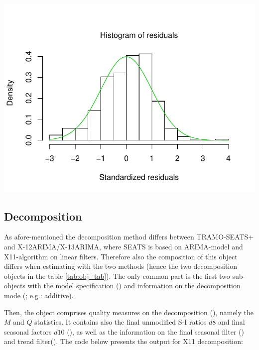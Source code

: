 \documentclass[article]{jss}
\begin{document}
\begin{CodeChunk}


\begin{center}\includegraphics{img/img-unnamed-chunk-6-1} \end{center}

\end{CodeChunk}

\hypertarget{decomposition}{%
\subsection{Decomposition}\label{decomposition}}

As afore-mentioned the decomposition method differs between TRAMO-SEATS+
and X-12ARIMA/X-13ARIMA, where SEATS is based on ARIMA-model and
X11-algorithm on linear filters. Therefore also the composition of this
object differs when estimating with the two methods (hence the two
decomposition objects in the table \ref{tab:obj_tab}). The only common
part is the first two sub-objects with the model specification
() and information on the decomposition mode
(; e.g.: additive).

Then, the  object comprises quality measures on
the decomposition (), namely the \(M\) and \(Q\)
statistics. It contains also the final unmodified S-I ratios \(d8\) and
final seasonal factors \(d10\) (), as well as the
information on the final seasonal filter () and trend
filter(). The code below presents the output for X11
decomposition:
\end{document}
